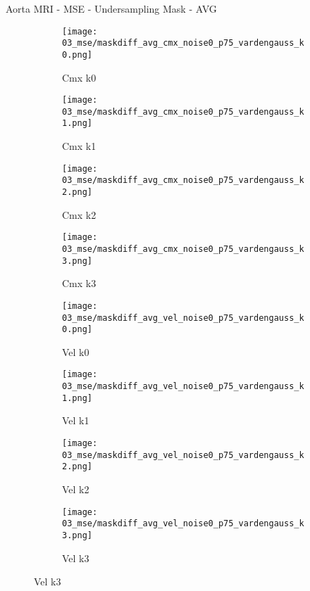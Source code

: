 \documentclass{beamer}
\begin{document}
\begin{frame}{Aorta MRI - MSE - Undersampling Mask - AVG}{}
\begin{figure}
\begin{subfigure}{0.24\textwidth}
\texttt{[image: 03\_mse/maskdiff\_avg\_cmx\_noise0\_p75\_vardengauss\_k0.png]}
\vspace{-20pt}
\caption*{\tiny Cmx k0}
\end{subfigure}
\begin{subfigure}{0.24\textwidth}
\texttt{[image: 03\_mse/maskdiff\_avg\_cmx\_noise0\_p75\_vardengauss\_k1.png]}
\vspace{-20pt}
\caption*{\tiny Cmx k1}
\end{subfigure}
\begin{subfigure}{0.24\textwidth}
\texttt{[image: 03\_mse/maskdiff\_avg\_cmx\_noise0\_p75\_vardengauss\_k2.png]}
\vspace{-20pt}
\caption*{\tiny Cmx k2}
\end{subfigure}
\begin{subfigure}{0.24\textwidth}
\texttt{[image: 03\_mse/maskdiff\_avg\_cmx\_noise0\_p75\_vardengauss\_k3.png]}
\vspace{-20pt}
\caption*{\tiny Cmx k3}
\end{subfigure}

\begin{subfigure}{0.24\textwidth}
\texttt{[image: 03\_mse/maskdiff\_avg\_vel\_noise0\_p75\_vardengauss\_k0.png]}
\vspace{-20pt}
\caption*{\tiny Vel k0}
\end{subfigure}
\begin{subfigure}{0.24\textwidth}
\texttt{[image: 03\_mse/maskdiff\_avg\_vel\_noise0\_p75\_vardengauss\_k1.png]}
\vspace{-20pt}
\caption*{\tiny Vel k1}
\end{subfigure}
\begin{subfigure}{0.24\textwidth}
\texttt{[image: 03\_mse/maskdiff\_avg\_vel\_noise0\_p75\_vardengauss\_k2.png]}
\vspace{-20pt}
\caption*{\tiny Vel k2}
\end{subfigure}
\begin{subfigure}{0.24\textwidth}
\texttt{[image: 03\_mse/maskdiff\_avg\_vel\_noise0\_p75\_vardengauss\_k3.png]}
\vspace{-20pt}
\caption*{\tiny Vel k3}
\end{subfigure}
\end{figure}
\end{frame}
\end{document}
